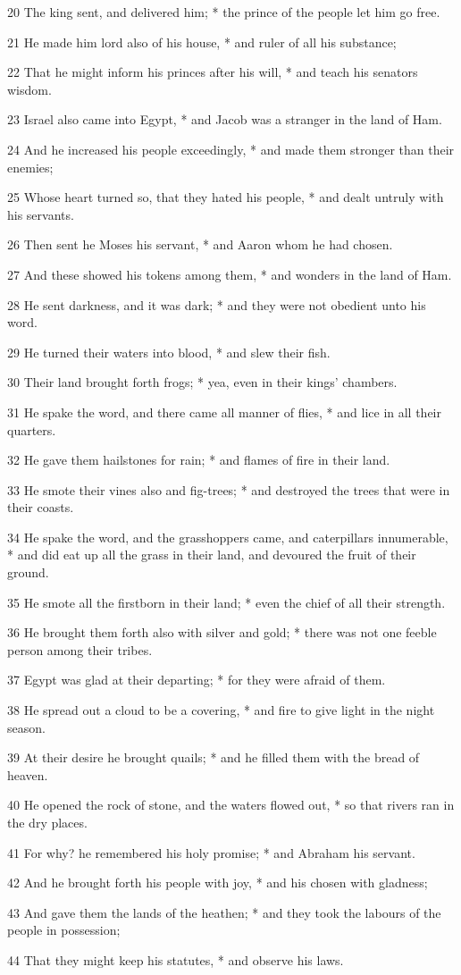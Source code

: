 20 The king sent, and delivered him; * the prince of the people let him go free.\par
21 He made him lord also of his house, * and ruler of all his substance;\par
22 That he might inform his princes after his will, * and teach his senators wisdom.\par
23 Israel also came into Egypt, * and Jacob was a stranger in the land of Ham.\par
24 And he increased his people exceedingly, * and made them stronger than their enemies;\par
25 Whose heart turned so, that they hated his people, * and dealt untruly with his servants.\par
26 Then sent he Moses his servant, * and Aaron whom he had chosen.\par
27 And these showed his tokens among them, * and wonders in the land of Ham.\par
28 He sent darkness, and it was dark; * and they were not obedient unto his word.\par
29 He turned their waters into blood, * and slew their fish.\par
30 Their land brought forth frogs; * yea, even in their kings' chambers.\par
31 He spake the word, and there came all manner of flies, * and lice in all their quarters.\par
32 He gave them hailstones for rain; * and flames of fire in their land.\par
33 He smote their vines also and fig-trees; * and destroyed the trees that were in their coasts.\par
34 He spake the word, and the grasshoppers came, and caterpillars innumerable, * and did eat up all the grass in their land, and devoured the fruit of their ground.\par
35 He smote all the firstborn in their land; * even the chief of all their strength.\par
36 He brought them forth also with silver and gold; * there was not one feeble person among their tribes.\par
37 Egypt was glad at their departing; * for they were afraid of them.\par
38 He spread out a cloud to be a covering, * and fire to give light in the night season.\par
39 At their desire he brought quails; * and he filled them with the bread of heaven.\par
40 He opened the rock of stone, and the waters flowed out, * so that rivers ran in the dry places.\par
41 For why? he remembered his holy promise; * and Abraham his servant.\par
42 And he brought forth his people with joy, * and his chosen with gladness;\par
43 And gave them the lands of the heathen; * and they took the labours of the people in possession;\par
44 That they might keep his statutes, * and observe his laws.
